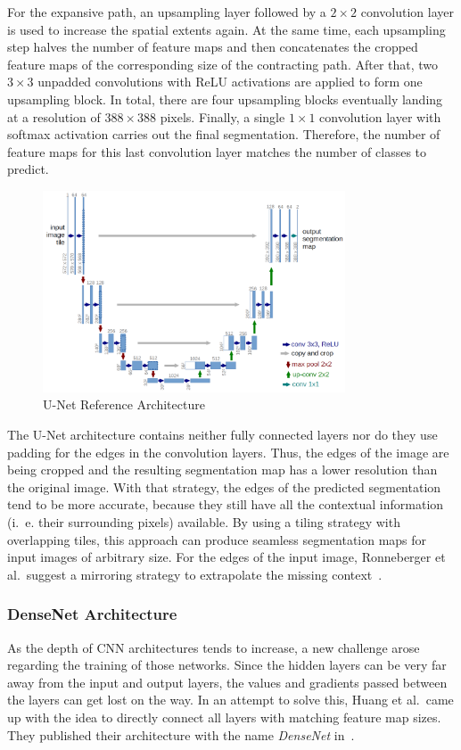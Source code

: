 For the expansive path, an upsampling layer followed by a $2\times 2$ convolution layer is used to increase the spatial extents again. At the same time, each upsampling step halves the number of feature maps and then concatenates the cropped feature maps of the corresponding size of the contracting path. After that, two $3\times 3$ unpadded convolutions with ReLU activations are applied to form one upsampling block. In total, there are four upsampling blocks eventually landing at a resolution of $388\times 388$ pixels. Finally, a single $1\times 1$ convolution layer with softmax activation carries out the final segmentation. Therefore, the number of feature maps for this last convolution layer matches the number of classes to predict.

\begin{figure}[h]
    \centering
    \includegraphics[width=0.8\textwidth]{images/u-net-architecture}
    \caption[U-Net Reference Architecture]{U-Net Reference Architecture~\cite{unet15}}
    \label{fig:unet_architecture}
\end{figure}

The U-Net architecture contains neither fully connected layers nor do they use padding for the edges in the convolution layers. Thus, the edges of the image are being cropped and the resulting segmentation map has a lower resolution than the original image. With that strategy, the edges of the predicted segmentation tend to be more accurate, because they still have all the contextual information (i.~e. their surrounding pixels) available. By using a tiling strategy with overlapping tiles, this approach can produce seamless segmentation maps for input images of arbitrary size. For the edges of the input image, Ronneberger et al.\ suggest a mirroring strategy to extrapolate the missing context~\cite{unet15}.

\subsubsection{DenseNet Architecture}
\label{sec:densenet}
As the depth of CNN architectures tends to increase, a new challenge arose regarding the training of those networks. Since the hidden layers can be very far away from the input and output layers, the values and gradients passed between the layers can get lost on the way. In an attempt to solve this, Huang et al.\ came up with the idea to directly connect all layers with matching feature map sizes. They published their architecture with the name \emph{DenseNet} in~\cite{densenet17}.

